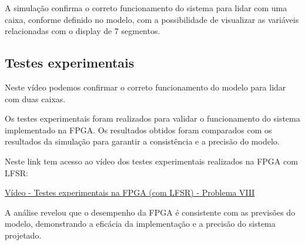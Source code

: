 A simulação confirma o correto funcionamento do sistema para lidar com uma caixa, conforme definido no modelo, com a possibilidade de visualizar as variáveis relacionadas com o display de 7 segmentos.

\newpage

\subsection{Testes experimentais}

Neste vídeo podemos confirmar o correto funcionamento do modelo para lidar com duas caixas.

Os testes experimentais foram realizados para validar o funcionamento do sistema implementado na FPGA. Os resultados obtidos foram comparados com os resultados da simulação para garantir a consistência e a precisão do modelo.

\vspace{1em}

Neste link tem acesso ao vídeo dos testes experimentais realizados na FPGA com LFSR:

\vspace{1em}

\href{https://unlpt-my.sharepoint.com/:v:/g/personal/jafe_lopes_fct_unl_pt/EUfG0AmgpbdCnV3bps2Vfq8Bga6xAOAGdk0vqau80iyzBw?e=B5ZtTT}{Vídeo - Testes experimentais na FPGA (com LFSR) - Problema VIII}

\vspace{1em}

A análise revelou que o desempenho da FPGA é consistente com as previsões do modelo, demonstrando a eficácia da implementação e a precisão do sistema projetado.

